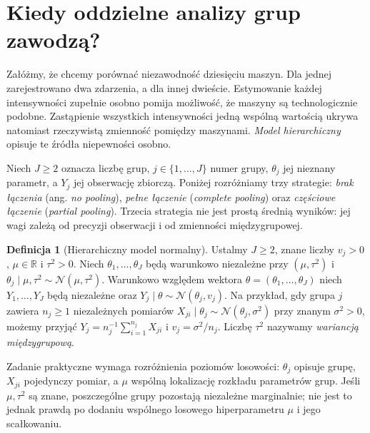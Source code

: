 \documentclass[11pt,a4paper,oneside]{report}
\numberwithin{equation}{chapter}
\theoremstyle{plain}
\theoremstyle{definition}
\newtheorem{definicja}{Definicja}[chapter]
\theoremstyle{remark}
\newcommand{\R}{\mathbb R}
\newcommand{\Normal}{\mathcal N}
\begin{document}
\section{Kiedy oddzielne analizy grup zawodzą?}
Załóżmy, że chcemy porównać niezawodność dziesięciu maszyn.
Dla jednej zarejestrowano dwa zdarzenia, a dla innej dwieście.
Estymowanie każdej intensywności zupełnie osobno pomija możliwość,
że maszyny są technologicznie podobne. Zastąpienie wszystkich
intensywności jedną wspólną wartością ukrywa natomiast rzeczywistą
zmienność pomiędzy maszynami. \emph{Model hierarchiczny} opisuje te
źródła niepewności osobno.

Niech $J\ge2$ oznacza liczbę grup, $j\in\{1,\ldots,J\}$ numer grupy,
$\theta_j$ jej nieznany parametr, a $Y_j$ jej obserwację zbiorczą.
Poniżej rozróżniamy trzy strategie: \emph{brak łączenia}
(ang. \emph{no pooling}), \emph{pełne łączenie}
(\emph{complete pooling}) oraz \emph{częściowe łączenie}
(\emph{partial pooling}). Trzecia strategia nie jest prostą średnią
wyników: jej wagi zależą od precyzji obserwacji i od zmienności
międzygrupowej.

\begin{definicja}[Hierarchiczny model normalny]
\label{def:normal-hierarchical}
Ustalmy $J\ge2$, znane liczby $v_j>0$, $\mu\in\R$ i $\tau^2>0$.
Niech $\theta_1,\ldots,\theta_J$ będą warunkowo niezależne przy
$(\mu,\tau^2)$ i $\theta_j\mid\mu,\tau^2\sim\Normal(\mu,\tau^2)$.
Warunkowo względem wektora $\theta=(\theta_1,\ldots,\theta_J)$
niech $Y_1,\ldots,Y_J$ będą niezależne oraz
$Y_j\mid\theta\sim\Normal(\theta_j,v_j)$.
Na przykład, gdy grupa $j$ zawiera $n_j\ge1$ niezależnych
pomiarów $X_{ji}\mid\theta_j\sim\Normal(\theta_j,\sigma^2)$
przy znanym $\sigma^2>0$, możemy przyjąć
$Y_j=n_j^{-1}\sum_{i=1}^{n_j}X_{ji}$ i $v_j=\sigma^2/n_j$.
Liczbę $\tau^2$ nazywamy \emph{wariancją międzygrupową}.
\end{definicja}

Zadanie praktyczne wymaga rozróżnienia poziomów losowości:
$\theta_j$ opisuje grupę, $X_{ji}$ pojedynczy pomiar, a $\mu$
wspólną lokalizację rozkładu parametrów grup. Jeśli $\mu,\tau^2$
są znane, poszczególne grupy pozostają niezależne marginalnie;
nie jest to jednak prawdą po dodaniu wspólnego losowego hiperparametru
$\mu$ i jego scałkowaniu.
\end{document}
